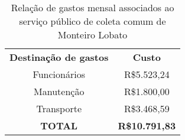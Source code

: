 \begin{table}[htbp]
  \centering
  \caption{Relação de gastos mensal associados ao serviço público de coleta comum de Monteiro Lobato}
    \begin{tabular}{cc}
    \rowcolor[rgb]{ .969,  .588,  .275} \textcolor[rgb]{ 1,  1,  1}{\textbf{Destinação de gastos}} & \textcolor[rgb]{ 1,  1,  1}{\textbf{Custo}} \\
    \rowcolor[rgb]{ .992,  .914,  .851} Funcionários & R\$5.523,24 \\
    \rowcolor[rgb]{ .984,  .831,  .706} Manutenção & R\$1.800,00 \\
    \rowcolor[rgb]{ .992,  .914,  .851} Transporte & R\$3.468,59 \\
    \rowcolor[rgb]{ .984,  .831,  .706} \textbf{TOTAL} & \textbf{R\$10.791,83} \\
    \end{tabular}%
  \label{tab:destinacao_gasto}%
\end{table}%
